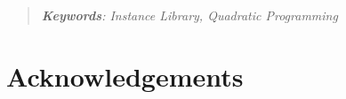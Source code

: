 \documentclass[smallextended]{svjour3}
\newenvironment{keywords}{\vspace{0.4in}\begin{quote}\small \em
{\bf Keywords\/}:}{\end{quote}}
\begin{document}
\else
 \begin{keywords}
  Instance Library, Quadratic Programming
 \end{keywords}
\fi


































\section{Acknowledgements}
\end{document}
